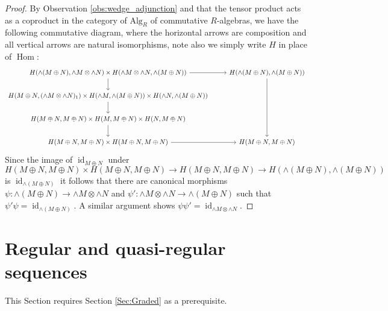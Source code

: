 \documentclass[12pt]{article}
\theoremstyle{plain}
\theoremstyle{definition}
\newcommand{\lto}{\longrightarrow}
\begin{document}
	\begin{proof}
		By Observation \ref{obs:wedge_adjunction} and that the tensor product acts as a coproduct in the category of $\text{Alg}_R$ of commutative $R$-algebras, we have the following commutative diagram, where the horizontal arrows are composition and all vertical arrows are natural isomorphisms, note also we simply write $H$ in place of $\operatorname{Hom}$:
		\begin{equation}
			\begin{tikzcd}
				H(\wedge(M \oplus N), \wedge M \otimes \wedge N) \times H(\wedge M \otimes \wedge N, \wedge(M \oplus N))\arrow[r]\arrow[d] & H(\wedge(M \oplus N), \wedge(M \oplus N))\arrow[ddd]\\
				H(M \oplus N, (\wedge M \otimes \wedge N)_1) \times H(\wedge M, \wedge(M \oplus N)) \times H(\wedge N, \wedge(M \oplus N))\arrow[d]\\
				H(M \oplus N, M \oplus N) \times H(M, M\oplus N) \times H(N, M \oplus N)\arrow[d]\\
				H(M \oplus N, M \oplus N) \times H(M \oplus N, M \oplus N)\arrow[r] & H(M \oplus N, M \oplus N)
			\end{tikzcd}
		\end{equation}
		Since the image of $\operatorname{id}_{M \oplus N}$ under
		\begin{equation}
			H(M \oplus N, M \oplus N) \times H(M \oplus N, M \oplus N)\lto H(M \oplus N, M \oplus N) \lto H(\wedge(M \oplus N), \wedge(M \oplus N))
		\end{equation}
		is $\operatorname{id}_{\wedge(M \oplus N)}$ it follows that there are canonical morphisms $\psi: \wedge(M \oplus N) \lto \wedge M \otimes \wedge N$ and $\psi': \wedge M \otimes \wedge N \lto \wedge (M \oplus N)$ such that $\psi' \psi = \operatorname{id}_{\wedge(M \oplus N)}$. A similar argument shows $\psi \psi' = \operatorname{id}_{\wedge M \otimes \wedge N}$.
	\end{proof}
	\section{Regular and quasi-regular sequences}
	This Section requires Section \ref{Sec:Graded} as a prerequisite.
\end{document}
